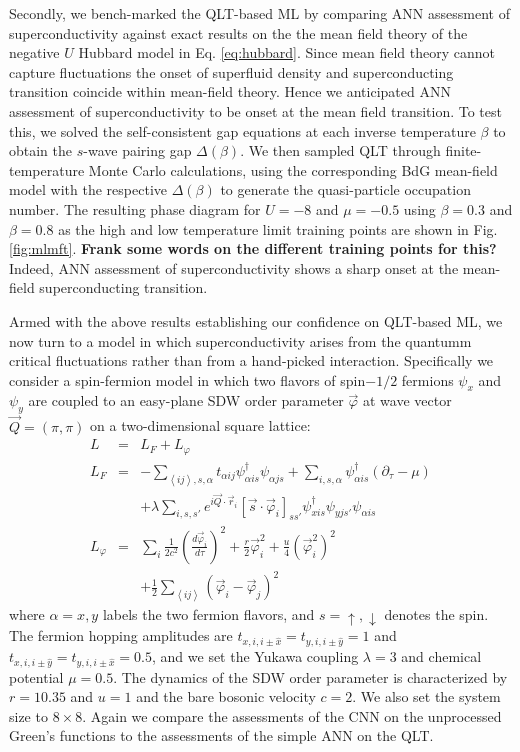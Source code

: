 \documentclass[amsmath,amssymb, aps, prx, longbibliography, twocolumn]{revtex4-1}
\begin{document}
Secondly, we bench-marked the QLT-based ML by comparing ANN assessment of superconductivity against exact results on the the mean field theory of the negative $U$ Hubbard model in Eq. \ref{eq:hubbard}. Since mean field theory cannot capture fluctuations the onset of superfluid density and superconducting transition coincide within mean-field theory. Hence we anticipated ANN assessment of superconductivity to be onset at the mean field transition. To test this,  we solved the self-consistent gap equations at  each inverse temperature $\beta$ to obtain the 
 $s$-wave pairing gap $\Delta(\beta)$. We then sampled QLT through finite-temperature Monte Carlo calculations, using the corresponding BdG mean-field model with the respective $\Delta(\beta)$ to generate the quasi-particle occupation number.
 The resulting phase diagram for $U=-8$ and $\mu=-0.5$
 using $\beta=0.3$ and $\beta=0.8$ as the high and  low temperature limit training points are shown in Fig. \ref{fig:mlmft}. {\color{red}\bf Frank some words on the different training points for this?} 
 Indeed, ANN assessment of superconductivity shows a sharp onset at the mean-field superconducting transition.

 Armed with the above results establishing our confidence on QLT-based ML, we now turn to a model in which superconductivity arises from the quantumm critical fluctuations rather than from a hand-picked interaction. Specifically we consider 
 a spin-fermion model in which two flavors of spin$-1/2$ fermions $\psi_x$ and $\psi_y$ are coupled to an easy-plane SDW order parameter $\vec{\varphi}$ at wave vector $\vec Q=(\pi, \pi)$ on a two-dimensional square lattice\cite{Erez2016}:
\begin{eqnarray}
L&=&L_F+L_\varphi \nonumber\\
L_F &=&  -\sum_{\left\langle ij \right\rangle, s, \alpha} t_{\alpha ij} \psi_{\alpha is}^\dagger \psi_{\alpha js} + \sum_{i, s, \alpha} \psi_{\alpha is}^\dagger \left(\partial_\tau - \mu \right)\nonumber \\
& & +\lambda \sum_{i,s,s'} e^{i \vec Q\cdot \vec r_i} \left[ \vec s\cdot \vec \varphi_i\right]_{ss'} \psi_{xis}^\dagger \psi_{yjs'}\psi_{\alpha is} \nonumber\\
L_\varphi &=& \sum_i \frac{1}{2c^2} \left(\frac{d\vec\varphi_i}{d\tau}\right)^2 + \frac{r}{2}\vec \varphi_i^2 + \frac{u}{4} (\vec \varphi_i^2)^2 \nonumber \\
& & +\frac{1}{2}\sum_{\left\langle ij \right\rangle} (\vec \varphi_i - \vec \varphi_j)^2
\label{eq:afmetal}
\end{eqnarray}
where $\alpha=x,y$ labels the two fermion flavors, and $s = \uparrow, \downarrow$ denotes the spin. The fermion hopping amplitudes are $t_{x,i,i\pm\hat x}=t_{y,i,i\pm\hat y}=1$ and $t_{x,i,i\pm\hat y}=t_{y,i,i\pm\hat x}=0.5$, and we set the Yukawa coupling $\lambda=3$ and chemical potential $\mu=0.5$. The dynamics of the SDW order parameter is characterized by $r=10.35$ and $u=1$ and the bare bosonic velocity $c=2$. We also set the system size to $8\times 8$. Again we compare the assessments of the CNN on the unprocessed Green's functions to the assessments of the simple ANN on the QLT. 
\end{document}
